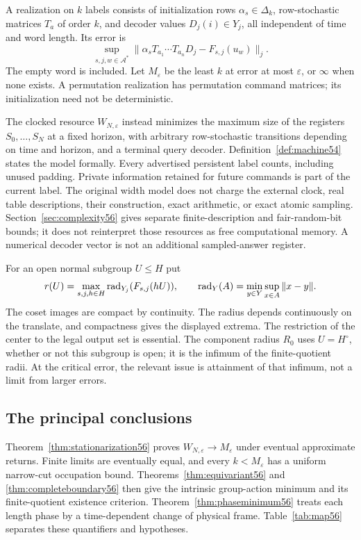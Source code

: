 \begin{definition}\label{def:stationary55}
A realization on $k$ labels consists of initialization rows $\alpha_s\in\Delta_k$, row-stochastic matrices $T_a$ of order $k$, and decoder values $D_j(i)\in Y_j$, all independent of time and word length. Its error is
\[
       \sup_{s,j,w\in\mathcal A^*}
        \|\alpha_sT_{a_1}\cdots T_{a_n}D_j-F_{s,j}(u_w)\|_j.
\]
The empty word is included. Let $M_\varepsilon$ be the least $k$ at error at most $\varepsilon$, or $\infty$ when none exists. A permutation realization has permutation command matrices; its initialization need not be deterministic.
\end{definition}
The clocked resource $W_{N,\varepsilon}$ instead minimizes the maximum size of the registers $S_0,\ldots,S_N$ at a fixed horizon, with arbitrary row-stochastic transitions depending on time and horizon, and a terminal query decoder. Definition~\ref{def:machine54} states the model formally. Every advertised persistent label counts, including unused padding. Private information retained for future commands is part of the current label. The original width model does not charge the external clock, real table descriptions, their construction, exact arithmetic, or exact atomic sampling. Section~\ref{sec:complexity56} gives separate finite-description and fair-random-bit bounds; it does not reinterpret those resources as free computational memory. A numerical decoder vector is not an additional sampled-answer register.

For an open normal subgroup $U\le H$ put
\begin{equation}\label{eq:quotientradius55}
 r(U)=\max_{s,j,h\in H}\operatorname{rad}_{Y_j}(F_{s,j}(hU)),
 \qquad\operatorname{rad}_Y(A)=\min_{y\in Y}\sup_{x\in A}\|x-y\|.
\end{equation}
The coset images are compact by continuity. The radius depends continuously on the translate, and compactness gives the displayed extrema. The restriction of the center to the legal output set is essential. The component radius $R_0$ uses $U=H^\circ$, whether or not this subgroup is open; it is the infimum of the finite-quotient radii. At the critical error, the relevant issue is attainment of that infimum, not a limit from larger errors.

\subsection{The principal conclusions}
Theorem~\ref{thm:stationarization56} proves $W_{N,\varepsilon}\to M_\varepsilon$ under eventual approximate returns. Finite limits are eventually equal, and every $k<M_\varepsilon$ has a uniform narrow-cut occupation bound. Theorems~\ref{thm:equivariant56} and \ref{thm:completeboundary56} then give the intrinsic group-action minimum and its finite-quotient existence criterion. Theorem~\ref{thm:phaseminimum56} treats each length phase by a time-dependent change of physical frame. Table~\ref{tab:map56} separates these quantifiers and hypotheses.

